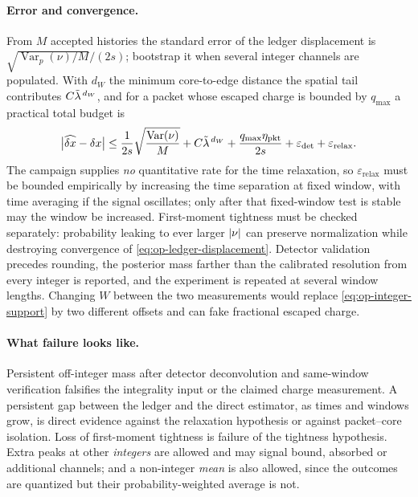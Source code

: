 \paragraph{Error and convergence.} From $M$ accepted histories the standard
error of the ledger displacement is $\sqrt{\operatorname{Var}_p(\nu)/M}/(2s)$;
bootstrap it when several integer channels are populated. With $d_W$ the
minimum core-to-edge distance the spatial tail contributes $C\tilde{\lambda}^{\,d_W}$,
and for a packet whose escaped charge is bounded by $q_{\max}$ a practical
total budget is
\begin{equation}
  \bigl|\widehat{\delta x}-\delta x\bigr|
  \le\frac{1}{2s}\sqrt{\frac{\operatorname{Var}(\nu)}{M}}
    +C\tilde{\lambda}^{\,d_W}
    +\frac{q_{\max}\eta_{\mathrm{pkt}}}{2s}
    +\varepsilon_{\det}+\varepsilon_{\mathrm{relax}} .
  \label{eq:op-tpm-budget}
\end{equation}
The campaign supplies \emph{no} quantitative rate for the time relaxation, so
$\varepsilon_{\mathrm{relax}}$ must be bounded empirically by increasing the
time separation at fixed window, with time averaging if the signal oscillates;
only after that fixed-window test is stable may the window be increased.
First-moment tightness must be checked separately: probability leaking to ever
larger $\lvert \nu\rvert$ can preserve normalization while destroying convergence of
\eqref{eq:op-ledger-displacement}. Detector validation precedes rounding, the
posterior mass farther than the calibrated resolution from every integer is
reported, and the experiment is repeated at several window lengths. Changing
$W$ between the two measurements would replace
\eqref{eq:op-integer-support} by two different offsets and can fake fractional
escaped charge.

\paragraph{What failure looks like.} Persistent off-integer mass after detector
deconvolution and same-window verification falsifies the integrality input or
the claimed charge measurement. A persistent gap between the ledger and the
direct estimator, as times and windows grow, is direct evidence against the
relaxation hypothesis or against packet--core isolation. Loss of first-moment
tightness is failure of the tightness hypothesis. Extra peaks at other
\emph{integers} are allowed and may signal bound, absorbed or additional
channels; and a non-integer \emph{mean} is also allowed, since the outcomes are
quantized but their probability-weighted average is not.

